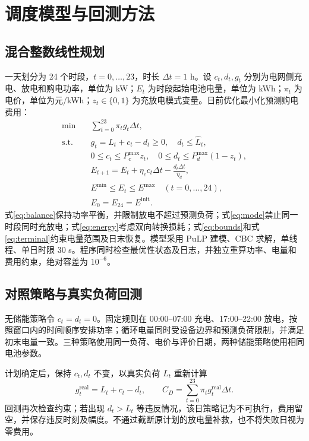 \documentclass[fontset=windows,12pt,a4paper]{ctexart}
\begin{document}
\section{调度模型与回测方法}
\subsection{混合整数线性规划}
一天划分为 24 个时段，$t=0,\ldots,23$，时长 $\Delta t=1$ h。设 $c_t,d_t,g_t$ 分别为电网侧充电、放电和购电功率，单位为 kW；$E_t$ 为时段起始电池电量，单位为 kWh；$\pi_t$ 为电价，单位为元/kWh；$z_t\in\{0,1\}$ 为充放电模式变量。日前优化最小化预测购电费用：
\begin{align}
\min\quad &\sum_{t=0}^{23}\pi_t g_t\Delta t,\label{eq:objective}\\
\text{s.t.}\quad &g_t=\widehat L_t+c_t-d_t\geq0,\quad d_t\leq\widehat L_t,\label{eq:balance}\\
&0\leq c_t\leq P_c^{\max}z_t,\quad 0\leq d_t\leq P_d^{\max}(1-z_t),\label{eq:mode}\\
&E_{t+1}=E_t+\eta_c c_t\Delta t-\frac{d_t\Delta t}{\eta_d},\label{eq:energy}\\
&E^{\min}\leq E_t\leq E^{\max}\quad(t=0,\ldots,24),\label{eq:bounds}\\
&E_0=E_{24}=E^{\mathrm{init}}.\label{eq:terminal}
\end{align}
式\eqref{eq:balance}保持功率平衡，并限制放电不超过预测负荷；式\eqref{eq:mode}禁止同一时段同时充放电；式\eqref{eq:energy}考虑双向转换损耗；式\eqref{eq:bounds}和式\eqref{eq:terminal}约束电量范围及日末恢复。模型采用 PuLP 建模、CBC 求解，单线程、单日时限 30 s。程序同时检查最优性状态及日志，并独立重算功率、电量和费用约束，绝对容差为 $10^{-6}$。

\subsection{对照策略与真实负荷回测}
无储能策略令 $c_t=d_t=0$。固定规则在 00:00--07:00 充电、17:00--22:00 放电，按照窗口内的时间顺序安排功率；循环电量同时受设备边界和预测负荷限制，并满足初末电量一致。三种策略使用同一负荷、电价与评价日期，两种储能策略使用相同电池参数。

计划确定后，保持 $c_t,d_t$ 不变，以真实负荷 $L_t$ 重新计算
\begin{equation}
g_t^{\mathrm{real}}=L_t+c_t-d_t,\qquad
C_D=\sum_{t=0}^{23}\pi_tg_t^{\mathrm{real}}\Delta t.
\label{eq:replay}
\end{equation}
回测再次检查约束；若出现 $d_t>L_t$ 等违反情况，该日策略记为不可执行，费用留空，并保存违反时刻及幅度。不通过截断原计划的放电量补救，也不将失败日视为零费用。
\end{document}
